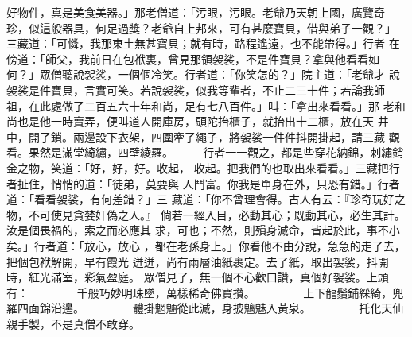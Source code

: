\begin{pinyinscope}
{好物件，真是美食美器。」那老僧道：「污眼，污眼。老爺乃天朝上國，廣覽奇
珍，似這般器具，何足過獎？老爺自上邦來，可有甚麼寶貝，借與弟子一觀？」
三藏道：「可憐，我那東土無甚寶貝；就有時，路程遙遠，也不能帶得。」行者
在傍道：「師父，我前日在包袱裏，曾見那領袈裟，不是件寶貝？拿與他看看如
何？」眾僧聽說袈裟，一個個冷笑。行者道：「你笑怎的？」院主道：「老爺才
說袈裟是件寶貝，言實可笑。若說袈裟，似我等輩者，不止二三十件；若論我師
祖，在此處做了二百五六十年和尚，足有七八百件。」叫：「拿出來看看。」那
老和尚也是他一時賣弄，便叫道人開庫房，頭陀抬櫃子，就抬出十二櫃，放在天
井中，開了鎖。兩邊設下衣架，四圍牽了繩子，將袈裟一件件抖開掛起，請三藏
觀看。果然是滿堂綺繡，四壁綾羅。
　　
行者一一觀之，都是些穿花納錦，刺繡銷金之物，笑道：「好，好，好。收起，
收起。把我們的也取出來看看。」三藏把行者扯住，悄悄的道：「徒弟，莫要與
人鬥富。你我是單身在外，只恐有錯。」行者道：「看看袈裟，有何差錯？」三
藏道：「你不曾理會得。古人有云：『珍奇玩好之物，不可使見貪婪奸偽之人。』
倘若一經入目，必動其心；既動其心，必生其計。汝是個畏禍的，索之而必應其
求，可也；不然，則殞身滅命，皆起於此，事不小矣。」行者道：「放心，放心
，都在老孫身上。」你看他不由分說，急急的走了去，把個包袱解開，早有霞光
迸迸，尚有兩層油紙裹定。去了紙，取出袈裟，抖開時，紅光滿室，彩氣盈庭。
眾僧見了，無一個不心歡口讚，真個好袈裟。上頭有：
　　　　千般巧妙明珠墜，萬樣稀奇佛寶攢。
　　　　上下龍鬚鋪綵綺，兜羅四面錦沿邊。
　　　　體掛魍魎從此滅，身披魑魅入黃泉。
　　　　托化天仙親手製，不是真僧不敢穿。

}
\end{pinyinscope}
